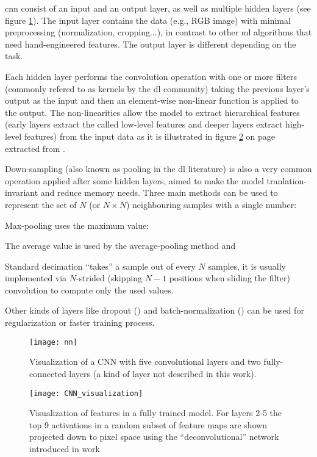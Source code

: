 \documentclass[../main.tex]{subfiles}
\begin{document}
\gls{cnn} consist of an input and an output layer, as well as multiple hidden
layers (see figure \ref{fig:alexnet}). The input layer contains the data
(e.g., RGB image) with minimal preprocessing (normalization, cropping...),
in contrast to other \gls{ml} algorithms that need hand-engineered features.
The output layer is different depending on the task.

Each hidden layer performs the convolution operation with one or more
filters (commonly refered to as kernels by the \gls{dl} community) taking the
previous layer's output as the input and then an element-wise
non-linear function is applied to the output.
The non-linearities allow the model to extract
hierarchical features (early layers extract the called low-level features
and deeper layers extract high-level features)
from the input data as it is illustrated in figure
\ref{fig:cnn-visualization} on page~\pageref{fig:cnn-visualization}
extracted from \cite{Zeiler2014}.

Down-sampling (also known as pooling in the \gls{dl} literature) is also a very
common operation applied after some hidden layers, aimed to make the model
tranlation-invariant and reduce memory needs.
Three main methods can be used to represent the set of
$N$ (or $N \times N$) neighbouring samples with a single number:
\begin{enumerate*}[label=\itshape\alph*\upshape)]
\item Max-pooling uses the maximum value;
\item The average value is used by the average-pooling method and
\item Standard decimation ``takes'' a sample out of every $N$ samples,
it is usually implemented via $N$-strided (skipping $N - 1$ positions when
sliding the filter) convolution to compute only the used values.
\label{n-strided-conv}
\end{enumerate*}

Other kinds of layers like dropout (\cite{Srivastava2014})
and batch-normalization (\cite{Ioffe2015}) can be used for regularization
or faster training process.

\begin{figure}[h]
\centering
\texttt{[image: nn]}
\caption{Visualization of a CNN with five convolutional layers and two
fully-connected layers (a kind of layer not described in this work).}
\label{fig:alexnet}
\end{figure}

\begin{figure}[h]
\centering
\texttt{[image: CNN\_visualization]}
\caption{Visualization of features in a fully trained model.
For layers 2-5 the top 9 activations in a random subset of feature maps are shown
projected down to pixel space using the ``deconvolutional'' network introduced in
\cite{Zeiler2014} work}
\label{fig:cnn-visualization}
\end{figure}
\end{document}
